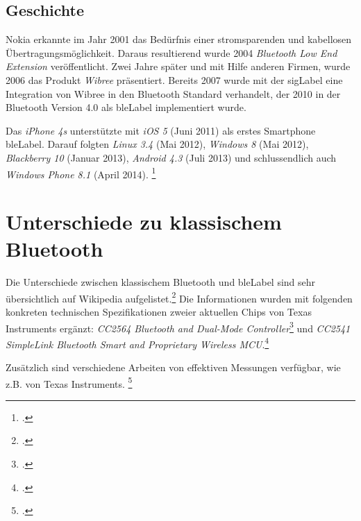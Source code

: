 \subsection{Geschichte}
Nokia erkannte im Jahr 2001 das Bedürfnis einer stromsparenden und kabellosen Übertragungsmöglichkeit.
Daraus resultierend wurde 2004 \textit{Bluetooth Low End Extension} veröffentlicht.
Zwei Jahre später und mit Hilfe anderen Firmen, wurde 2006 das Produkt \textit{Wibree} präsentiert.
Bereits 2007 wurde mit der \gls{sigLabel} eine Integration von Wibree in den Bluetooth Standard verhandelt, der 2010 in der Bluetooth Version 4.0 als \gls{bleLabel} implementiert wurde.

Das \textit{iPhone 4s} unterstützte mit \textit{iOS 5} (Juni 2011) als erstes Smartphone \gls{bleLabel}.
Darauf folgten \textit{Linux 3.4} (Mai 2012), \textit{Windows 8} (Mai 2012), \textit{Blackberry 10} (Januar 2013), \textit{Android 4.3} (Juli 2013) und schlussendlich auch \textit{Windows Phone 8.1} (April 2014).
\footcite{Bluetooth_low_energy_Wikipedia_2015-04-17}


\section{Unterschiede zu klassischem Bluetooth}
Die Unterschiede zwischen klassischem Bluetooth und \gls{bleLabel} sind sehr übersichtlich auf Wikipedia aufgelistet.\footcite{Bluetooth_low_energy_Wikipedia_2015-04-17}
Die Informationen wurden mit folgenden konkreten technischen Spezifikationen zweier aktuellen Chips von Texas Instruments ergänzt:
\textit{CC2564 Bluetooth and Dual-Mode Controller}\footcite{CC2564_DualMode_2015-05-08} und \textit{CC2541 SimpleLink Bluetooth Smart and Proprietary Wireless MCU}.\footcite{CC2541_BLE_2015-05-08}

Zusätzlich sind verschiedene Arbeiten von effektiven Messungen verfügbar, wie z.B. von Texas Instruments. \footcite{powerconsumption_comparison_2015-04-27}

